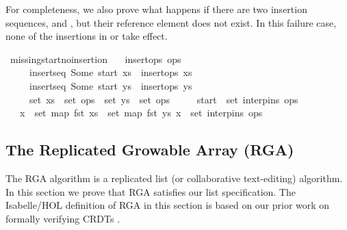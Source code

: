 \noindent
For completeness, we also prove what happens if there are two insertion sequences,  and , but their reference element  does not exist.
In this failure case, none of the insertions in  or  take effect.
\begin{isabelle}
\isamarkupfalse%
\ missing{\isacharunderscore}start{\isacharunderscore}no{\isacharunderscore}insertion{\isacharcolon}\isanewline
\ \ \ {\isachardoublequoteopen}insert{\isacharunderscore}ops\ ops{\isachardoublequoteclose}\isanewline
\ \ \ \ \ {\isachardoublequoteopen}insert{\isacharunderscore}seq\ {\isacharparenleft}Some\ start{\isacharparenright}\ xs{\isachardoublequoteclose}\ \ {\isachardoublequoteopen}insert{\isacharunderscore}ops\ xs{\isachardoublequoteclose}\isanewline
\ \ \ \ \ {\isachardoublequoteopen}insert{\isacharunderscore}seq\ {\isacharparenleft}Some\ start{\isacharparenright}\ ys{\isachardoublequoteclose}\ \ {\isachardoublequoteopen}insert{\isacharunderscore}ops\ ys{\isachardoublequoteclose}\isanewline
\ \ \ \ \ {\isachardoublequoteopen}set\ xs\ {\isasymsubseteq}\ set\ ops{\isachardoublequoteclose}\ \ {\isachardoublequoteopen}set\ ys\ {\isasymsubseteq}\ set\ ops{\isachardoublequoteclose}\isanewline
\ \ \ \ \ {\isachardoublequoteopen}start\ {\isasymnotin}\ set\ {\isacharparenleft}interp{\isacharunderscore}ins\ ops{\isacharparenright}{\isachardoublequoteclose}\isanewline
\ \ \ {\isachardoublequoteopen}{\isasymforall}x\ {\isasymin}\ set\ {\isacharparenleft}map\ fst\ xs{\isacharparenright}\ {\isasymunion}\ set\ {\isacharparenleft}map\ fst\ ys{\isacharparenright}{\isachardot}\ x\ {\isasymnotin}\ set\ {\isacharparenleft}interp{\isacharunderscore}ins\ ops{\isacharparenright}{\isachardoublequoteclose}
\end{isabelle}

\subsection{The Replicated Growable Array (RGA)}

The RGA algorithm \cite{Roh:2011dw} is a replicated list (or collaborative text-editing) algorithm.
In this section we prove that RGA satisfies our list specification.
The Isabelle/HOL definition of RGA in this section is based on our prior work on formally verifying CRDTs \cite{Gomes:2017gy,Gomes:2017vo}.

